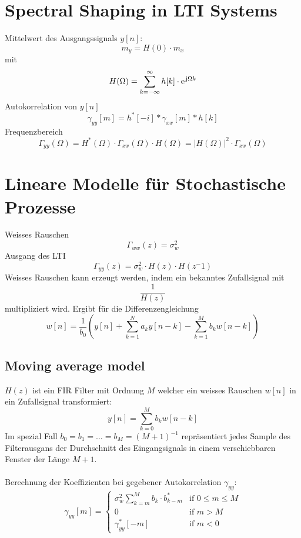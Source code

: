 \section{Spectral Shaping in LTI Systems}
Mittelwert des Ausgangssignals $y[n]$:
\[ m_y = H(0) \cdot m_x \]
mit
\[ H(\Omega) = \sum_{k=-\infty}^{\infty}h[k]\cdot\e^{\im\Omega k} \]
Autokorrelation von $y[n]$
\[ \gamma_{yy}[m] = h^*[-i]*\gamma_{xx}[m]*h[k] \]
Frequenzbereich
\[ \Gamma_{yy}(\Omega) = H^*(\Omega)\cdot\Gamma_{xx}(\Omega)\cdot H(\Omega) 
	= |H(\Omega)|^2 \cdot \Gamma_{xx}(\Omega) \]
	
\section{Lineare Modelle für Stochastische Prozesse}
Weisses Rauschen
\[ \Gamma_{ww}(z) = \sigma_w^2 \]
Ausgang des LTI
\[ \Gamma_{yy}(z) = \sigma_w^2 \cdot H(z) \cdot H(z^-1) \]
Weisses Rauschen kann erzeugt werden, indem ein bekanntes Zufallsignal mit
\[ \frac{1}{H(z)} \]
multipliziert wird. Ergibt für die Differenzengleichung
\[ w[n] = \frac{1}{b_0}\left( y[n] + \sum_{k=1}^{N}a_ky[n-k] - 
	\sum_{k=1}^{M}b_kw[n-k] \right) \]
	
\subsection{Moving average model}
$H(z)$ ist ein FIR Filter mit Ordnung $M$ welcher ein weisses Rauschen $w[n]$
in ein Zufallsignal transformiert:
\[ y[n] = \sum_{k=0}^{M}b_kw[n-k] \]
Im spezial Fall $b_0=b_1=\ldots=b_M=(M+1)^{-1}$ repräsentiert jedes Sample des
Filterausgans der Durchschnitt des Eingangsignals in einem verschiebbaren
Fenster der Länge $M+1$.\\
\\
Berechnung der Koeffizienten bei gegebener Autokorrelation $\gamma_{yy}$:
\[ \gamma_{yy}[m] = \left\lbrace \begin{matrix}
	\sigma_w^2\sum_{k=m}^{M}b_k\cdot b_{k-m}^* & \textrm{if } 0\leq m \leq M\\
	0	& \textrm{if } m > M\\
	\gamma_{yy}^*[-m]	& \textrm{if } m < 0
\end{matrix}\right. \]

